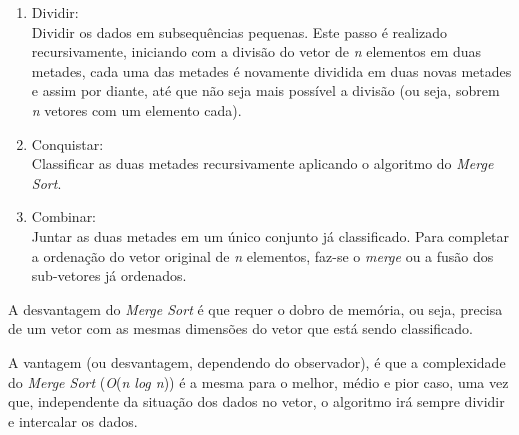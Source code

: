 		\begin{enumerate}
			\item Dividir:\\
				Dividir os dados em subsequências pequenas. Este passo é realizado recursivamente, iniciando com a divisão do vetor de \textit{n} elementos em duas metades, cada uma das metades é novamente dividida em duas novas metades e assim por diante, até que não seja mais possível a divisão (ou seja, sobrem \textit{n} vetores com um elemento cada).
				
			\item Conquistar:\\
				Classificar as duas metades recursivamente aplicando o algoritmo do \textit{Merge Sort}.
			
			\item Combinar:\\
				Juntar as duas metades em um único conjunto já classificado. Para completar a ordenação do vetor original de \textit{n} elementos, faz-se o \textit{merge} ou a fusão dos sub-vetores já ordenados.
		\end{enumerate}
		
		A desvantagem do \textit{Merge Sort} é que requer o dobro de memória, ou seja, precisa de um vetor com as mesmas dimensões do vetor que está sendo classificado.
		
		A vantagem (ou desvantagem, dependendo do observador), é que a complexidade do \textit{Merge Sort} (\textit{O}(\textit{n log n})) é a mesma para o melhor, médio e pior caso, uma vez que, independente da situação dos dados no vetor, o algoritmo irá sempre dividir e intercalar os dados.
